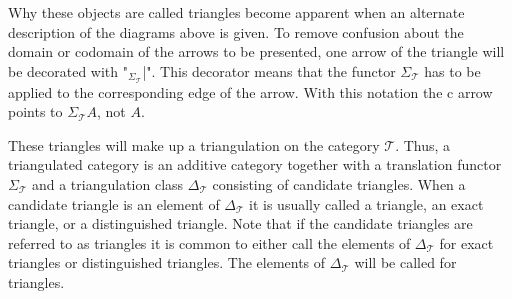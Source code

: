     Why these objects are called triangles become apparent when an alternate description of the diagrams above is given. To remove confusion about the domain or codomain of the arrows to be presented, one arrow of the triangle will be decorated with "$_{\Sigma_{\mathcal{T}}}$|". This decorator means that the functor $\Sigma_{\mathcal{T}}$ has to be applied to the corresponding edge of the arrow. With this notation the c arrow points to $\Sigma_{\mathcal{T}}A$, not $A$.

    \begin{center}
    \end{center}

    These triangles will make up a triangulation on the category $\mathcal{T}$. Thus, a triangulated category is an additive category together with a translation functor $\Sigma_{\mathcal{T}}$ and a triangulation class $\Delta_{\mathcal{T}}$ consisting of candidate triangles. When a candidate triangle is an element of $\Delta_{\mathcal{T}}$ it is usually called a triangle, an exact triangle, or a distinguished triangle. Note that if the candidate triangles are referred to as triangles it is common to either call the elements of $\Delta_{\mathcal{T}}$ for exact triangles or distinguished triangles. The elements of $\Delta_{\mathcal{T}}$ will be called for triangles.

